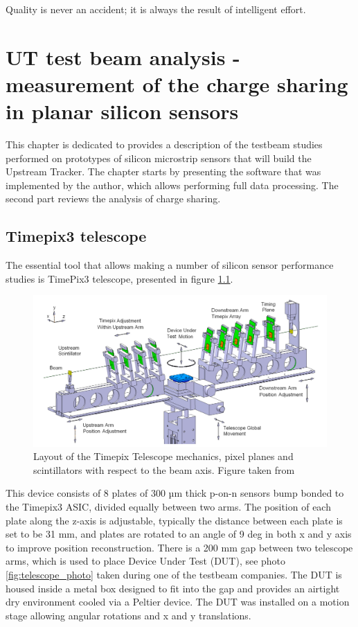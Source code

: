 \begin{savequote}[75mm] 
Quality is never an accident; it is always the result of intelligent effort. 
\end{savequote}


\chapter{UT test beam analysis - measurement of the charge sharing
in planar silicon sensors}


This chapter is dedicated to provides a description of the testbeam studies performed on prototypes of silicon microstrip sensors that will build the Upstream Tracker. The chapter starts by presenting the software that was implemented by the author, which allows performing full data processing. The second part reviews the analysis of charge sharing. 





\section{Timepix3 telescope}
The essential tool that allows making a number of silicon sensor performance studies is TimePix3 telescope, presented in figure \ref{fig:telescope}. 


\begin{figure}[!h]
\centering
\includegraphics{figures/telescope.png}
\caption{Layout of the Timepix Telescope mechanics, pixel planes and scintillators with respect to the beam axis. Figure taken from \cite{telescope}}
\label{fig:telescope}
\end{figure}


This device consists of 8 plates of 300 µm thick p-on-n sensors bump bonded to the Timepix3 ASIC, divided equally between two arms. The position of each plate along the z-axis is adjustable, typically the distance between each plate is set to be 31 mm, and plates are rotated to an angle of 9 deg in both x and y axis to improve position reconstruction. There is a 200 mm gap between two telescope arms, which is used to place Device Under Test (DUT), see photo \ref{fig:telescope_photo} taken during one of the testbeam companies. The DUT is housed inside a metal box designed to fit into the gap and provides an airtight dry environment cooled via a Peltier device. 
The DUT was installed on a motion stage allowing angular rotations and x and y translations. 


